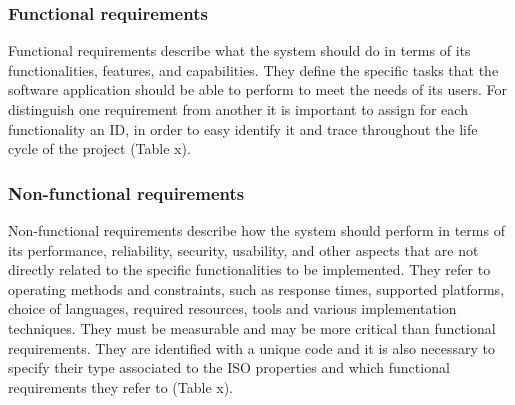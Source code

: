 \subsubsection{Functional requirements}
Functional requirements describe what the system should do in terms of its functionalities, features, and capabilities. They define the specific tasks that the software application should be able to perform to meet the needs of its users. For distinguish one requirement from another it is important to assign for each functionality an ID, in order to easy identify it and trace throughout the life cycle of the project (Table x).


\subsubsection{Non-functional requirements}
Non-functional requirements describe how the system should perform in terms of its performance, reliability, security, usability, and other aspects that are not directly related to the specific functionalities to be implemented. They refer to operating methods and constraints, such as response times, supported platforms, choice of languages, required resources, tools and various implementation techniques. They must be measurable and may be more critical than functional requirements.
They are identified with a unique code and it is also necessary to specify their type associated to the ISO properties and which functional requirements they refer to (Table x).

